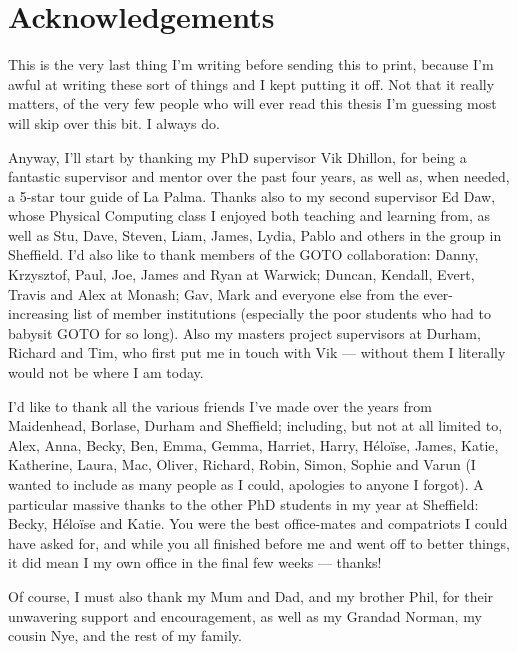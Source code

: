 \chapter*{Acknowledgements}

\begin{onehalfspace}

This is the very last thing I'm writing before sending this to print, because I'm awful at writing these sort of things and I kept putting it off. Not that it really matters, of the very few people who will ever read this thesis I'm guessing most will skip over this bit. I always do.

\medskip

Anyway, I'll start by thanking my PhD supervisor Vik Dhillon, for being a fantastic supervisor and mentor over the past four years, as well as, when needed, a 5-star tour guide of La Palma. Thanks also to my second supervisor Ed Daw, whose Physical Computing class I enjoyed both teaching and learning from, as well as Stu, Dave, Steven, Liam, James, Lydia, Pablo and others in the group in Sheffield. I'd also like to thank members of the GOTO collaboration: Danny, Krzysztof, Paul, Joe, James and Ryan at Warwick; Duncan, Kendall, Evert, Travis and Alex at Monash; Gav, Mark and everyone else from the ever-increasing list of member institutions (especially the poor students who had to babysit GOTO for so long). Also my masters project supervisors at Durham, Richard and Tim, who first put me in touch with Vik --- without them I literally would not be where I am today.

\medskip

I'd like to thank all the various friends I've made over the years from Maidenhead, Borlase, Durham and Sheffield; including, but not at all limited to, Alex, Anna, Becky, Ben, Emma, Gemma, Harriet, Harry, Héloïse, James, Katie, Katherine, Laura, Mac, Oliver, Richard, Robin, Simon, Sophie and Varun (I wanted to include as many people as I could, apologies to anyone I forgot). A particular massive thanks to the other PhD students in my year at Sheffield: Becky, Héloïse and Katie. You were the best office-mates and compatriots I could have asked for, and while you all finished before me and went off to better things, it did mean I my own office in the final few weeks --- thanks!

\medskip

Of course, I must also thank my Mum and Dad, and my brother Phil, for their unwavering support and encouragement, as well as my Grandad Norman, my cousin Nye, and the rest of my family.


\end{onehalfspace}
